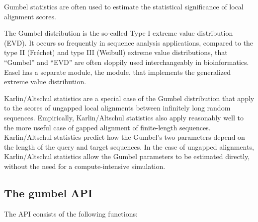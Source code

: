 
Gumbel statistics are often used to estimate the statistical
significance of local alignment scores.

The Gumbel distribution is the so-called Type I extreme value
distribution (EVD). It occurs so frequently in sequence analysis
applications, compared to the type II (Fr\'{e}chet) and type III
(Weibull) extreme value distributions, that ``Gumbel'' and ``EVD'' are
often sloppily used interchangeably in bioinformatics. Easel has a
separate module, the  module, that implements the
generalized extreme value distribution.

Karlin/Altschul statistics are a special case of the Gumbel
distribution that apply to the scores of ungapped local alignments
between infinitely long random sequences. Empirically, Karlin/Altschul
statistics also apply reasonably well to the more useful case of
gapped alignment of finite-length sequences. Karlin/Altschul
statistics predict how the Gumbel's two parameters depend on the
length of the query and target sequences. In the case of ungapped
alignments, Karlin/Altschul statistics allow the Gumbel parameters to
be estimated directly, without the need for a compute-intensive
simulation.

\subsection{The gumbel API}

The  API consists of the following functions:

